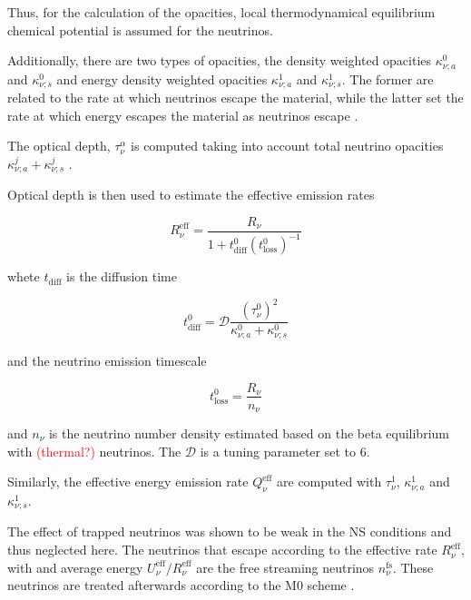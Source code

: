 \documentclass[11pt,a4paper,headinclude=true,DIV=14,BCOR=8mm,chapterprefix,listof=totoc,twoside,openright,abstracton]{scrbook}
\newcommand{\red}[1]{\textcolor{red}{#1}}
\begin{document}
Thus, for the calculation of the opacities, local thermodynamical equilibrium chemical potential
is assumed for the neutrinos.

Additionally, there are two types of opacities, the density weighted opacities $\kappa_{\nu;a}^0$ and $\kappa_{\nu;s}^0$ and energy density weighted opacities $\kappa_{\nu;a}^1$ and $\kappa_{\nu;s}^1$. 
The former are related to the rate at which neutrinos escape the material, while the latter set the rate at which energy escapes the material as neutrinos escape \cite{Ruffert:1995fs}.

The optical depth, $\tau_{\nu}^{\alpha}$ is computed taking into account total neutrino opacities $\kappa_{\nu;a}^j + \kappa_{\nu;s}^j$ \cite{Neilsen:2014hha}.

Optical depth is then used to estimate the effective emission rates \cite{Ruffert:1995fs}

\begin{equation}
R_{\nu}^{\text{eff}} = \frac{R_{\nu}}{1 + t_{\text{diff}}^0(t^0_{\text{loss}})^{-1}}
\label{eq:method:whisky:Rnueff}
\end{equation}

whete $t_{\text{diff}}$ is the diffusion time

\begin{equation}
t_{\text{diff}}^{0} = \mathcal{D}\frac{(\tau_{\nu}^0)^2}{\kappa_{\nu;a}^0 + \kappa_{\nu;s}^0}
\end{equation}

and the neutrino emission timescale 

\begin{equation}
t_{\text{loss}}^0 = \frac{R_{\nu}}{n_{\nu}}
\end{equation}

and $n_{\nu}$ is the neutrino number density estimated based on the beta equilibrium with \red{(thermal?)} neutrinos.
The $\mathcal{D}$ is a tuning parameter set to $6$.

Similarly, the effective energy emission rate $Q_{\nu}^{\text{eff}}$ are computed with $\tau_{\nu}^1$, $\kappa_{\nu;a}^1$ and $\kappa_{\nu;s}^1$.

The effect of trapped neutrinos was shown to be weak in the NS conditions \cite{Galeazzi:2013mia} and thus neglected here.
The neutrinos that escape according to the effective rate $R_{\nu}^{\text{eff}}$,
with and average energy $U_{\nu}^{\text{eff}}/R_{\nu}^{\text{eff}}$ are the free streaming neutrinos $n_{\nu}^{\text{fs}}$. 
These neutrinos are treated afterwards according to the M0 scheme \cite{Radice:2016dwd}.
\end{document}
